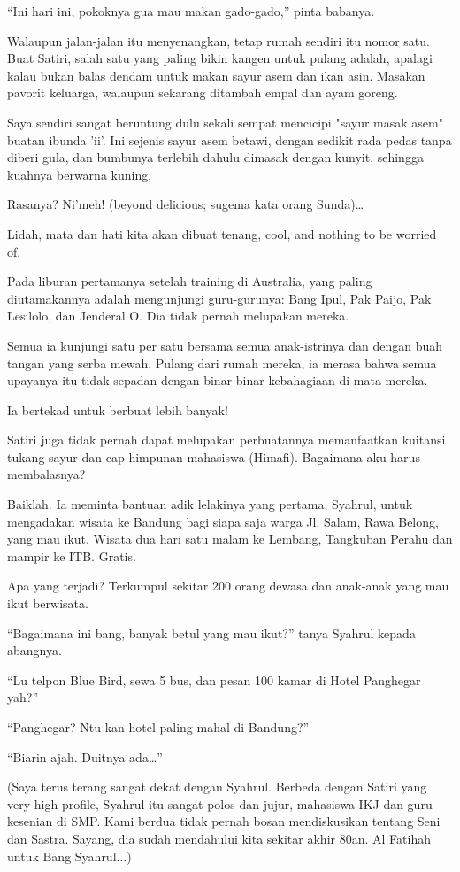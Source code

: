 “Ini hari ini, pokoknya gua mau makan gado-gado,” pinta babanya.

Walaupun jalan-jalan itu menyenangkan, tetap rumah sendiri itu nomor satu. Buat Satiri, salah satu yang paling bikin kangen untuk pulang adalah, apalagi kalau bukan balas dendam untuk makan sayur asem dan ikan asin. Masakan pavorit keluarga, walaupun sekarang ditambah empal dan ayam goreng.

Saya sendiri sangat beruntung dulu sekali sempat mencicipi "sayur masak asem" buatan ibunda 'ii'. Ini sejenis sayur asem betawi, dengan sedikit rada pedas tanpa diberi gula, dan bumbunya terlebih dahulu dimasak dengan kunyit, sehingga kuahnya berwarna kuning.

Rasanya? Ni’meh! (beyond delicious; sugema kata orang Sunda)…

Lidah, mata dan hati kita akan dibuat tenang, cool, and nothing to be worried of.

Pada liburan pertamanya setelah training di Australia, yang paling diutamakannya adalah mengunjungi guru-gurunya: Bang Ipul, Pak Paijo, Pak Lesilolo, dan Jenderal O. Dia tidak pernah melupakan mereka.

Semua ia kunjungi satu per satu bersama semua anak-istrinya dan dengan buah tangan yang serba mewah. Pulang dari rumah mereka, ia merasa bahwa semua upayanya itu tidak sepadan dengan binar-binar kebahagiaan di mata mereka.

Ia bertekad untuk berbuat lebih banyak!

Satiri juga tidak pernah dapat melupakan perbuatannya memanfaatkan kuitansi tukang sayur dan cap himpunan mahasiswa (Himafi). Bagaimana aku harus membalasnya?

Baiklah. Ia meminta bantuan adik lelakinya yang pertama, Syahrul, untuk mengadakan wisata ke Bandung bagi siapa saja warga Jl. Salam, Rawa Belong, yang mau ikut. Wisata dua hari satu malam ke Lembang, Tangkuban Perahu dan mampir ke ITB. Gratis.

Apa yang terjadi? Terkumpul sekitar 200 orang dewasa dan anak-anak yang mau ikut berwisata.

“Bagaimana ini bang, banyak betul yang mau ikut?” tanya Syahrul kepada abangnya.

“Lu telpon Blue Bird, sewa 5 bus, dan pesan 100 kamar di Hotel Panghegar yah?”

“Panghegar? Ntu kan hotel paling mahal di Bandung?”

“Biarin ajah. Duitnya ada…”

(Saya terus terang sangat dekat dengan Syahrul. Berbeda dengan Satiri yang very high profile, Syahrul itu sangat polos dan jujur, mahasiswa IKJ dan guru kesenian di SMP. Kami berdua tidak pernah bosan mendiskusikan tentang Seni dan Sastra. Sayang, dia sudah mendahului kita sekitar akhir 80an. Al Fatihah untuk Bang Syahrul...)

